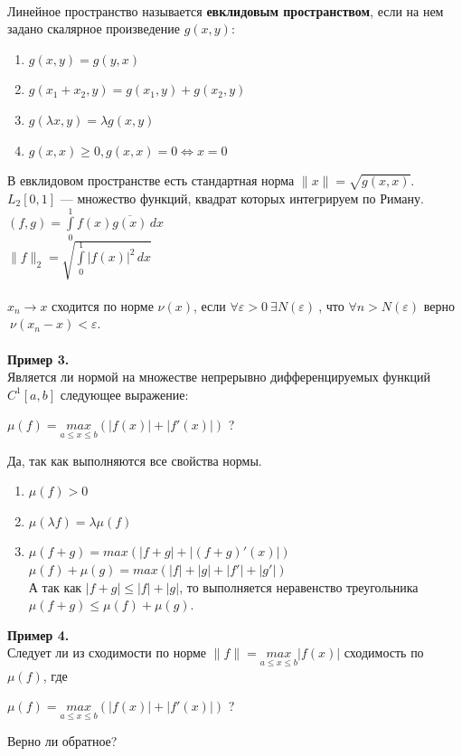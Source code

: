 \documentclass[12pt]{article}
\theoremstyle{definition}
\numberwithin{equation}{section}
\begin{document}
\\
Линейное пространство называется \textbf{евклидовым пространством}, если на нем задано скалярное произведение $g(x, y)$:\begin{enumerate}
\item $g(x, y) = g(y, x)$
\item $g(x_1+x_2, y) = g(x_1, y)+g(x_2, y)$
\item $g(\lambda x, y) = \lambda g(x, y)$
\item $g(x, x) \geqslant 0, g(x, x) = 0 \Leftrightarrow x = 0$
\end{enumerate}
В евклидовом пространстве есть стандартная норма $\parallel x \parallel = \sqrt{g(x, x)}$.\\
$L_2[0, 1]$ --- множество функций, квадрат которых интегрируем по Риману.\\
$(f, g) = \int\limits_0^1 f(x) \overline{g(x)}\,dx$\\
$\parallel f \parallel_2 = \sqrt{\int\limits_0^1 |f(x)|^2\,dx}$\\
\\
$x_n \to x$ $\textbf{сходится по норме}$ $\nu(x)$, если $\forall \varepsilon > 0 ~ \exists N(\varepsilon)~$, что $\forall n > N(\varepsilon)$ верно $~\nu(x_n - x) < \varepsilon$.\\ \\
\textbf{Пример 3.}\\
Является ли нормой на множестве непрерывно дифференцируемых функций $C^1[a, b]$ следующее выражение: \begin{center}$\mu(f) = \underset{a \leqslant x \leqslant b}{max}(|f(x)|+|f'(x)|)$ ?\end{center}
Да, так как выполняются все свойства нормы.\begin{enumerate}
\item $\mu(f) > 0$
\item $\mu(\lambda f) = \lambda \mu(f)$
\item $\mu(f+g) = max(|f+g|+|(f+g)'(x)|)$\\
$\mu(f)+\mu(g) = max(|f|+|g|+|f'|+|g'|)$\\
А так как $|f+g|\leqslant |f|+|g|$, то выполняется неравенство треугольника \\$\mu(f+g) \leqslant \mu(f) + \mu(g)$.\end{enumerate}
\textbf{Пример 4.}\\ Следует ли из сходимости по норме $\parallel f \parallel = \underset{a \leqslant x \leqslant b}{max} |f(x)|$ сходимость по $\mu(f)$, где \begin{center}$\mu(f) = \underset{a \leqslant x \leqslant b}{max}(|f(x)|+|f'(x)|)$ ?\end{center} Верно ли обратное?\\ \\
\end{document}
